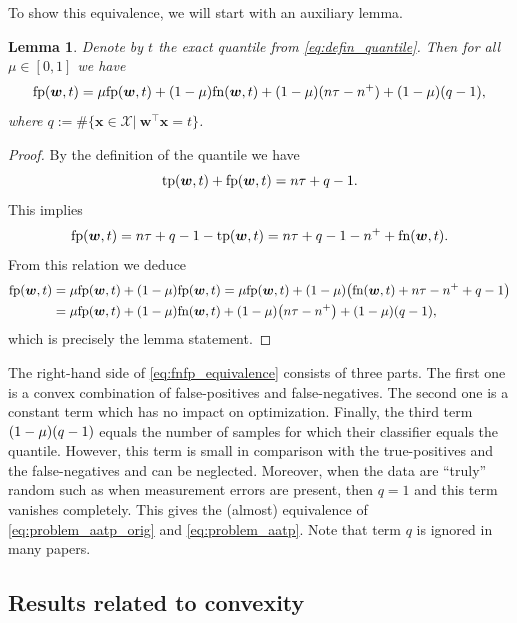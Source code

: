 \documentclass[]{interact}
\theoremstyle{plain}%
\newtheorem{lemma}[theorem]{Lemma}
\theoremstyle{definition}
\theoremstyle{remark}
\let\originalleft\left
\let\originalright\right
\renewcommand{\left}{\mathopen{}\mathclose\bgroup\originalleft}
\renewcommand{\right}{\aftergroup\egroup\originalright}
\newcommand{\tp}{\textnormal{tp}}
\newcommand{\fp}{\textnormal{fp}}
\newcommand{\fn}{\textnormal{fn}}
\begin{document}
To show this equivalence, we will start with an auxiliary lemma.

\begin{lemma}\label{lemma:fnfp_equivalence}
Denote by $t$ the exact quantile from \eqref{eq:defin_quantile}. Then for all $\mu\in[0,1]$ we have
\begin{equation}\label{eq:fnfp_equivalence}
\fp (\bm w,t) = \mu \fp(\bm w,t) + (1-\mu)\fn(\bm w,t) + (1-\mu)(n\tau - n^+) + (1-\mu)(q - 1),
\end{equation}
where $q:= \#\{\bm x\in\mathcal X|\ \bm w^\top \bm x= t\}$.
\end{lemma}
\begin{proof}
By the definition of the quantile we have
$$
\tp(\bm w,t)+\fp(\bm w,t) = n\tau + q-1.
$$
This implies
$$
\fp(\bm w,t)=n\tau +q - 1-\tp(\bm w,t) =n\tau+q-1-n^{+} +\fn(\bm w,t).
$$
From this relation we deduce
$$
\aligned
\fp(\bm w,t) &= \mu \fp(\bm w,t) + (1-\mu)\fp(\bm w,t) = \mu \fp(\bm w,t) + (1-\mu)\left(\fn(\bm w,t) + n\tau - n^+ + q - 1\right)\\
&= \mu \fp(\bm w,t) + (1-\mu)\fn(\bm w,t) + (1-\mu)\left(n\tau - n^+\right) + (1-\mu)\left(q - 1\right),
\endaligned
$$
which is precisely the lemma statement.
\end{proof}


The right-hand side of \eqref{eq:fnfp_equivalence} consists of three parts. The first one is a convex combination of false-positives and false-negatives. The second one is a constant term which has no impact on optimization. Finally, the third term $(1-\mu)\left(q - 1\right)$ equals the number of samples for which their classifier equals the quantile. However, this term is small in comparison with the true-positives and the false-negatives and can be neglected. Moreover, when the data are ``truly'' random such as when measurement errors are present, then $q=1$ and this term vanishes completely. This gives the (almost) equivalence of \eqref{eq:problem_aatp_orig} and \eqref{eq:problem_aatp}. Note that term $q$ is ignored in many papers.



\subsection{Results related to convexity}
\end{document}
